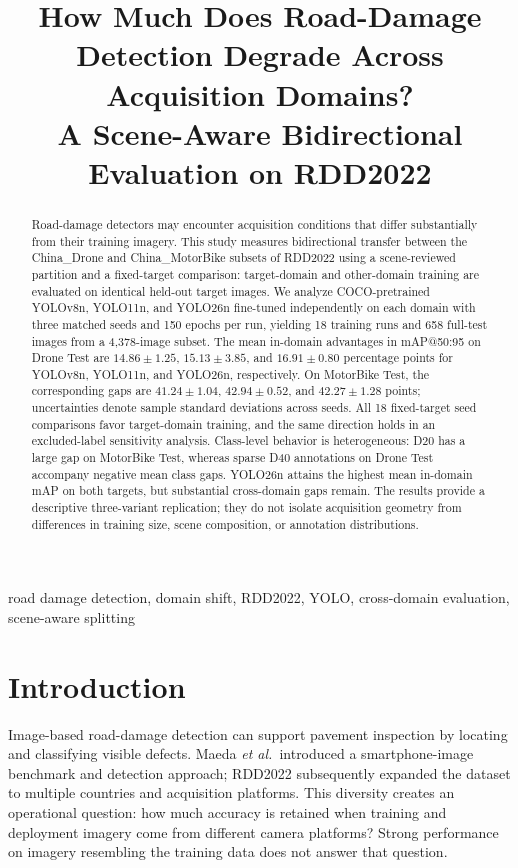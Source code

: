 \documentclass[conference,a4paper]{IEEEtran}
\title{How Much Does Road-Damage Detection Degrade Across Acquisition Domains?\\A Scene-Aware Bidirectional Evaluation on RDD2022}
\author{\IEEEauthorblockN{Lê Thành Luân\IEEEauthorrefmark{1}, Phạm Bá Anh Tuấn\IEEEauthorrefmark{2}}\IEEEauthorblockA{University of Science and Technology -- The University of Danang, Da Nang, Vietnam\\\IEEEauthorrefmark{1}102250416@hv.dut.udn.vn; \IEEEauthorrefmark{2}102250421@hv.dut.udn.vn}}
\begin{document}
\maketitle

\begin{abstract}
Road-damage detectors may encounter acquisition conditions that differ substantially from their training imagery. This study measures bidirectional transfer between the China\_Drone and China\_MotorBike subsets of RDD2022 using a scene-reviewed partition and a fixed-target comparison: target-domain and other-domain training are evaluated on identical held-out target images. We analyze COCO-pretrained YOLOv8n, YOLO11n, and YOLO26n fine-tuned independently on each domain with three matched seeds and 150 epochs per run, yielding 18 training runs and 658 full-test images from a 4,378-image subset. The mean in-domain advantages in mAP@50:95 on Drone Test are $14.86\pm1.25$, $15.13\pm3.85$, and $16.91\pm0.80$ percentage points for YOLOv8n, YOLO11n, and YOLO26n, respectively. On MotorBike Test, the corresponding gaps are $41.24\pm1.04$, $42.94\pm0.52$, and $42.27\pm1.28$ points; uncertainties denote sample standard deviations across seeds. All 18 fixed-target seed comparisons favor target-domain training, and the same direction holds in an excluded-label sensitivity analysis. Class-level behavior is heterogeneous: D20 has a large gap on MotorBike Test, whereas sparse D40 annotations on Drone Test accompany negative mean class gaps. YOLO26n attains the highest mean in-domain mAP on both targets, but substantial cross-domain gaps remain. The results provide a descriptive three-variant replication; they do not isolate acquisition geometry from differences in training size, scene composition, or annotation distributions.
\end{abstract}

\begin{IEEEkeywords}
road damage detection, domain shift, RDD2022, YOLO, cross-domain evaluation, scene-aware splitting
\end{IEEEkeywords}

\section{Introduction}
Image-based road-damage detection can support pavement inspection by locating and classifying visible defects. Maeda \emph{et al.}\ introduced a smartphone-image benchmark and detection approach\cite{maeda2018road}; RDD2022 subsequently expanded the dataset to multiple countries and acquisition platforms\cite{arya2024rdd2022}. This diversity creates an operational question: how much accuracy is retained when training and deployment imagery come from different camera platforms? Strong performance on imagery resembling the training data does not answer that question.
\end{document}
